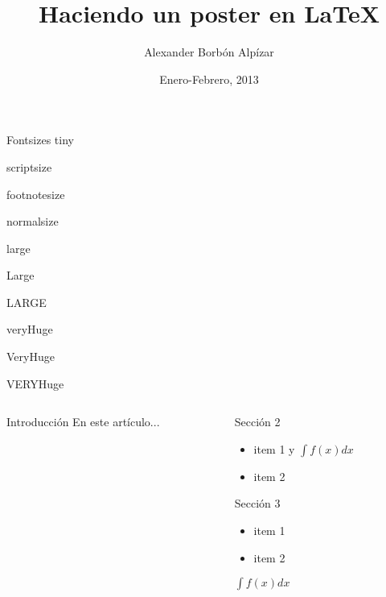 \documentclass{beamer}
\title[Posters]{\VERYHuge Haciendo un poster en \LaTeX}
\author[Alex]{\huge Alexander Borb\'on Alp\'izar}
\institute[ITCR]{\Large Instituto Tecnol\'ogico de Costa Rica}
\date{Enero-Febrero, 2013}
\begin{document}
  \begin{frame}[plain]{} 
  	\maketitle
    \vfill
    \begin{block}{\large Fontsizes}
      \centering
      {\tiny tiny}\par
      {\scriptsize scriptsize}\par
      {\footnotesize footnotesize}\par
      {\normalsize normalsize}\par
      {\large large}\par
      {\Large Large}\par
      {\LARGE LARGE}\par
      {\veryHuge veryHuge}\par
      {\VeryHuge VeryHuge}\par
      {\VERYHuge VERYHuge}\par
    \end{block}
    \vfill
    \begin{columns}[t]
      \begin{column}{.48\linewidth}
        \begin{block}{Introducci\'on}
          En este art\'iculo...
        \end{block}
      \end{column}
      \begin{column}{.48\linewidth}
        \begin{block}{Secci\'on 2}
          \begin{itemize}
          \item item 1 y $\int f(x) dx$
          \item item 2
          \end{itemize}
        \end{block}
        \begin{block}{Secci\'on 3}
          \begin{itemize}
          \item item 1
          \item item 2
          \end{itemize}
          $\int f(x) dx$
        \end{block}
      \end{column}
    \end{columns}
  \end{frame}
\end{document}
